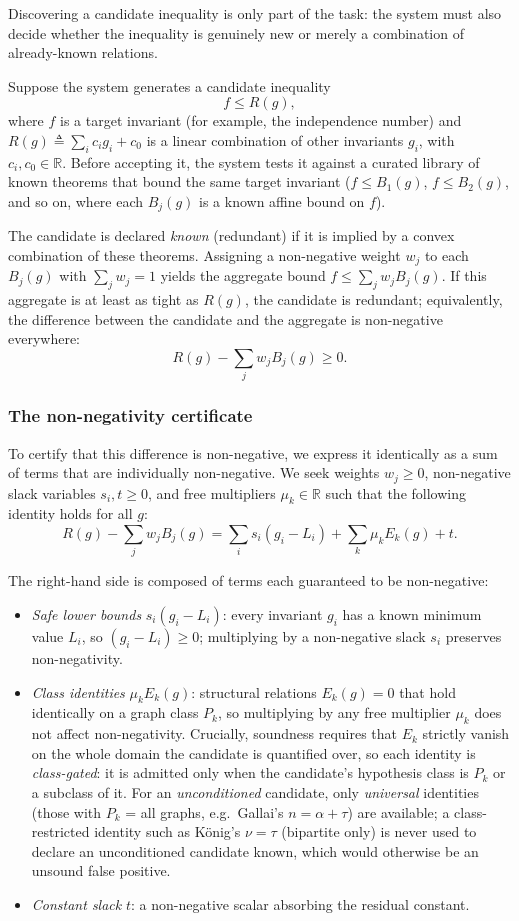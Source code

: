 \documentclass[]{ceurart}
\begin{document}
Discovering a candidate inequality is only part of the task: the system must also
decide whether the inequality is genuinely new or merely a combination of
already-known relations.

Suppose the system generates a candidate inequality
\[
    f \le R(g),
\]
where $f$ is a target invariant (for example, the independence number) and $R(g) \triangleq \sum_i c_i g_i + c_0$ is a linear combination of other invariants $g_i$, with $c_i, c_0 \in \mathbb{R}$. Before accepting it, the system tests it against a curated library of known theorems that bound the same target invariant ($f \le B_1(g)$, $f \le B_2(g)$, and so on, where each $B_j(g)$ is a known affine bound on $f$).

The candidate is declared \emph{known} (redundant) if it is implied by a convex combination of these theorems. Assigning a non-negative weight $w_j$ to each $B_j(g)$ with $\sum_j w_j = 1$ yields the aggregate bound $f \le \sum_j w_j B_j(g)$. If this aggregate is at least as tight as $R(g)$, the candidate is redundant; equivalently, the difference between the candidate and the aggregate is non-negative everywhere:
\[
    R(g) - \sum_j w_j B_j(g) \ge 0.
\]

\subsubsection*{The non-negativity certificate}

To certify that this difference is non-negative, we express it identically as a sum of terms that are individually non-negative. We seek weights $w_j \ge 0$, non-negative slack variables $s_i, t \ge 0$, and free multipliers $\mu_k \in \mathbb{R}$ such that the following identity holds for all $g$:
\[
    R(g) - \sum_j w_j B_j(g) = \sum_i s_i(g_i - L_i) + \sum_k \mu_k E_k(g) + t.
\]

The right-hand side is composed of terms each guaranteed to be non-negative:
\begin{itemize}
    \item \emph{Safe lower bounds} $s_i(g_i - L_i)$: every invariant $g_i$ has a known minimum value $L_i$, so $(g_i - L_i) \ge 0$; multiplying by a non-negative slack $s_i$ preserves non-negativity.
    \item \emph{Class identities} $\mu_k E_k(g)$: structural relations $E_k(g)=0$ that hold identically on a graph class $P_k$, so multiplying by any free multiplier $\mu_k$ does not affect non-negativity. Crucially, soundness requires that $E_k$ strictly vanish on the whole domain the candidate is quantified over, so each identity is \emph{class-gated}: it is admitted only when the candidate's hypothesis class is $P_k$ or a subclass of it. For an \emph{unconditioned} candidate, only \emph{universal} identities (those with $P_k$ = all graphs, e.g.\ Gallai's $n=\alpha+\tau$) are available; a class-restricted identity such as K\"onig's $\nu=\tau$ (bipartite only) is never used to declare an unconditioned candidate known, which would otherwise be an unsound false positive.
    \item \emph{Constant slack} $t$: a non-negative scalar absorbing the residual constant.
\end{itemize}
\end{document}
